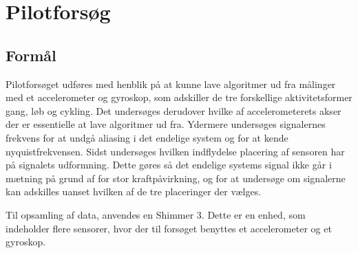 \chapter{Pilotforsøg}\vspace{-.75cm}\label{pilot}
\section{Formål}
Pilotforsøget udføres med henblik på at kunne lave algoritmer ud fra målinger med et accelerometer og gyroskop, som adskiller de tre forskellige aktivitetsformer gang, løb og cykling. Det undersøges derudover hvilke af accelerometerets akser der er essentielle at lave algoritmer ud fra. Ydermere undersøges signalernes frekvens for at undgå aliasing i det endelige system og for at kende nyquistfrekvensen. Sidst undersøges hvilken indflydelse placering af sensoren har på signalets udformning. Dette gøres så det endelige systems signal ikke går i mætning på grund af for stor kraftpåvirkning, og for at undersøge om signalerne kan adskilles uanset hvilken af de tre placeringer der vælges.

Til opsamling af data, anvendes en Shimmer 3. Dette er en enhed, som indeholder flere sensorer, hvor der til forsøget benyttes et accelerometer og et gyroskop. 



